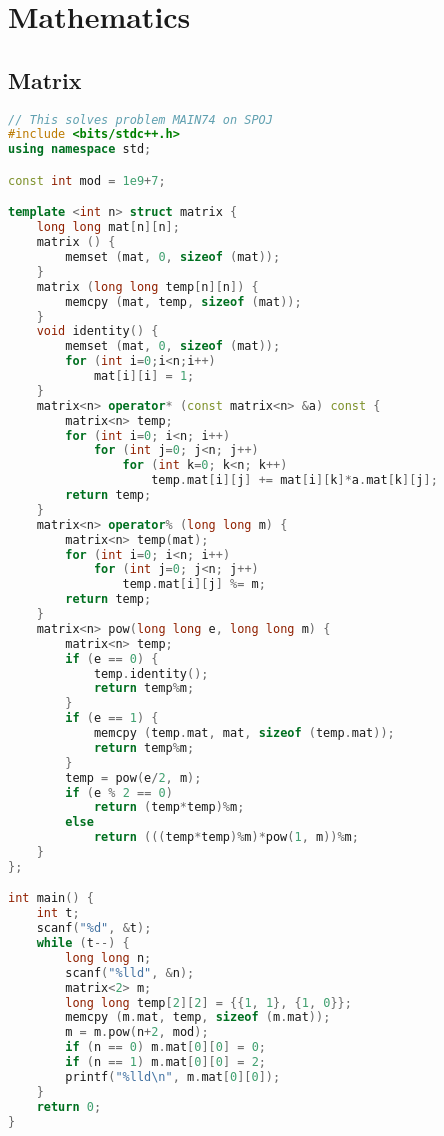 \documentclass{article}
\begin{document}
\section{Mathematics}
\subsection{Matrix}
\begin{lstlisting}[language=C++]
// This solves problem MAIN74 on SPOJ
#include <bits/stdc++.h>
using namespace std;

const int mod = 1e9+7;

template <int n> struct matrix {
	long long mat[n][n];
	matrix () {
		memset (mat, 0, sizeof (mat));
	}
	matrix (long long temp[n][n]) {
		memcpy (mat, temp, sizeof (mat));
	}
	void identity() {
		memset (mat, 0, sizeof (mat));
		for (int i=0;i<n;i++)
			mat[i][i] = 1;
	}
	matrix<n> operator* (const matrix<n> &a) const {
		matrix<n> temp;
		for (int i=0; i<n; i++)
			for (int j=0; j<n; j++)
				for (int k=0; k<n; k++)
					temp.mat[i][j] += mat[i][k]*a.mat[k][j];
		return temp;
	}
	matrix<n> operator% (long long m) {
		matrix<n> temp(mat);
		for (int i=0; i<n; i++)
			for (int j=0; j<n; j++)
				temp.mat[i][j] %= m;
		return temp;
	}
	matrix<n> pow(long long e, long long m) {
		matrix<n> temp;
		if (e == 0) {
			temp.identity();
			return temp%m;
		}
		if (e == 1) {
			memcpy (temp.mat, mat, sizeof (temp.mat));
			return temp%m;
		}
		temp = pow(e/2, m);
		if (e % 2 == 0)
			return (temp*temp)%m;
		else
			return (((temp*temp)%m)*pow(1, m))%m;
	}
};

int main() {
	int t;
	scanf("%d", &t);
	while (t--) {
		long long n;
		scanf("%lld", &n);
		matrix<2> m;
		long long temp[2][2] = {{1, 1}, {1, 0}};
		memcpy (m.mat, temp, sizeof (m.mat));
		m = m.pow(n+2, mod);
		if (n == 0) m.mat[0][0] = 0;
		if (n == 1) m.mat[0][0] = 2;
		printf("%lld\n", m.mat[0][0]);
	}
    return 0;
}

\end{lstlisting}
\end{document}
